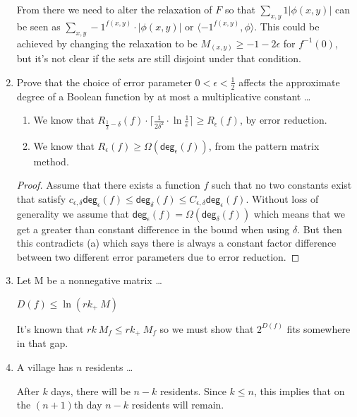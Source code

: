 \documentclass[usletter]{article}
\begin{document}
\begin{enumerate}
    From there we need to alter the relaxation of $F$ so that $\sum_{x,y} 1 |\phi(x,y)|$ can be seen as $\sum_{x,y} -1^{f(x,y)} \cdot |\phi(x,y)|$ or $\langle -1^{f(x,y)}, \phi \rangle$. This could be achieved by changing the relaxation to be $M_(x,y) \geq -1-2\epsilon$ for $f^{-1}(0)$, but it's not clear if the sets are still disjoint under that condition.

  \item Prove that the choice of error parameter $0 < \epsilon < \frac{1}{2}$ affects the approximate degree of a Boolean function by at most a multiplicative constant \ldots

    \begin{enumerate}
      \item We know that $R_{\frac{1}{2} - \delta}(f) \cdot \lceil \frac{1}{2\delta^2} \cdot \ln \frac{1}{\epsilon} \rceil \geq R_{\epsilon}(f)$, by error reduction.
      \item We know that $R_{\epsilon}(f) \geq \Omega(\mathsf{deg}_{\epsilon}(f))$, from the pattern matrix method.
    \end{enumerate}

    \begin{proof}
      Assume that there exists a function $f$ such that no two constants exist that satisfy $c_{\epsilon,\delta}\mathsf{deg}_{\epsilon}(f) \leq \mathsf{deg}_{\delta}(f) \leq C_{\epsilon,\delta}\mathsf{deg}_{\epsilon}(f)$. Without loss of generality we assume that $\mathsf{deg}_{\epsilon}(f) = \Omega(\mathsf{deg}_{\delta}(f))$ which means that we get a greater than constant difference in the bound when using $\delta$. But then this contradicts (a) which says there is always a constant factor difference between two different error parameters due to error reduction.
    \end{proof}


  \item Let M be a nonnegative matrix \ldots

    \begin{claim}
      $D(f) \leq \ln(rk_+\ M)$
    \end{claim}

    It's known that $rk\ M_f \leq rk_+\ M_f$ \cite{wikipedia} so we must show that $2^{D(f)}$ fits somewhere in that gap.

  \item A village has $n$ residents \ldots

    \begin{claim}
      After $k$ days, there will be $n - k$ residents. Since $k \leq n$, this implies that on the $(n + 1)$th day $n - k$ residents will remain.
    \end{claim}


\end{enumerate}
\end{document}
